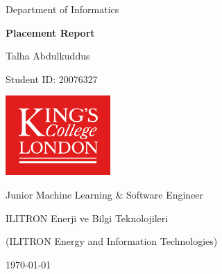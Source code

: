 \begin{titlepage}
    \begin{center}
        \small
        Department of Informatics

        \Huge
        \textbf{Placement Report}

        \vspace{25mm}
        \LARGE
        Talha Abdulkuddus

        \small
        Student ID\@: 20076327

        \vfill

        \includegraphics[width=40mm]{KCL-Logo} %

        \vfill

        \large
        Junior Machine Learning \& Software Engineer

        ILITRON Enerji ve Bilgi Teknolojileri

        \small
        (ILITRON Energy and Information Technologies)

        \vspace{15mm}
        \Large
        \today
    \end{center}
\end{titlepage}
